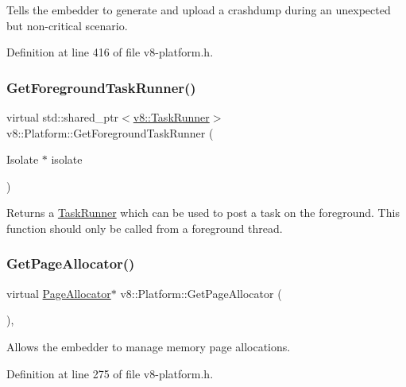 Tells the embedder to generate and upload a crashdump during an unexpected but non-\/critical scenario. 

Definition at line 416 of file v8-\/platform.\+h.

\mbox{\label{classv8_1_1Platform_af0d18c6bbefa133c5d11ec8a460d0278}} 
\subsubsection{\texorpdfstring{Get\+Foreground\+Task\+Runner()}{GetForegroundTaskRunner()}}
{\footnotesize\ttfamily virtual std\+::shared\+\_\+ptr$<$\mbox{\hyperlink{classv8_1_1TaskRunner}{v8\+::\+Task\+Runner}}$>$ v8\+::\+Platform\+::\+Get\+Foreground\+Task\+Runner (\begin{DoxyParamCaption}\item[{Isolate $\ast$}]{isolate }\end{DoxyParamCaption})\hspace{0.3cm}{\ttfamily [pure virtual]}}

Returns a \mbox{\hyperlink{classv8_1_1TaskRunner}{Task\+Runner}} which can be used to post a task on the foreground. This function should only be called from a foreground thread. \mbox{\label{classv8_1_1Platform_ab7c1886dd8131f7389b805bc98276702}} 
\subsubsection{\texorpdfstring{Get\+Page\+Allocator()}{GetPageAllocator()}}
{\footnotesize\ttfamily virtual \mbox{\hyperlink{classv8_1_1PageAllocator}{Page\+Allocator}}$\ast$ v8\+::\+Platform\+::\+Get\+Page\+Allocator (\begin{DoxyParamCaption}{ }\end{DoxyParamCaption})\hspace{0.3cm}{\ttfamily [inline]}, {\ttfamily [virtual]}}

Allows the embedder to manage memory page allocations. 

Definition at line 275 of file v8-\/platform.\+h.

